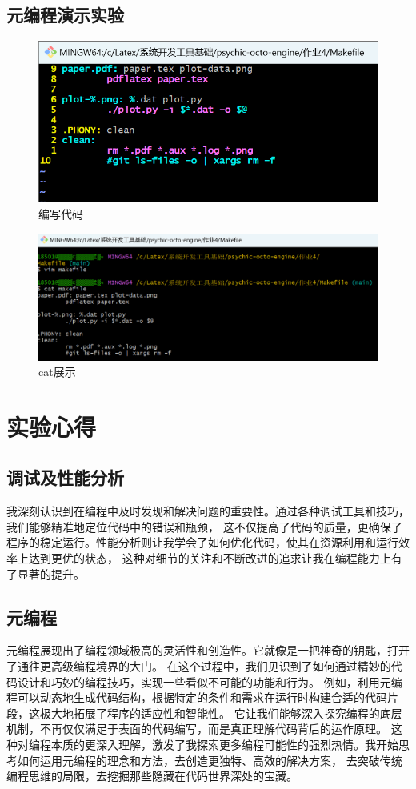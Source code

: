 \documentclass{ctexart}
\begin{document}
\subsection{元编程演示实验}
\begin{figure}[H]
    \centering
    \includegraphics[width=14cm]{09f974d450731081da5f3ccb4bd1c0a4.png}
    \caption{编写代码}
    \label{fig:12}
    \end{figure}   
    \begin{figure}[H]
        \centering
        \includegraphics[width=14cm]{59f36beaa9e3ab13bc041dc5a0a419a5.png}
        \caption{cat展示}
        \label{fig:12}
        \end{figure}   
\section{实验心得}
\subsection{调试及性能分析}
我深刻认识到在编程中及时发现和解决问题的重要性。通过各种调试工具和技巧，我们能够精准地定位代码中的错误和瓶颈，
这不仅提高了代码的质量，更确保了程序的稳定运行。性能分析则让我学会了如何优化代码，使其在资源利用和运行效率上达到更优的状态，
这种对细节的关注和不断改进的追求让我在编程能力上有了显著的提升。

\subsection{元编程}
元编程展现出了编程领域极高的灵活性和创造性。它就像是一把神奇的钥匙，打开了通往更高级编程境界的大门。
在这个过程中，我们见识到了如何通过精妙的代码设计和巧妙的编程技巧，实现一些看似不可能的功能和行为。
例如，利用元编程可以动态地生成代码结构，根据特定的条件和需求在运行时构建合适的代码片段，这极大地拓展了程序的适应性和智能性。
它让我们能够深入探究编程的底层机制，不再仅仅满足于表面的代码编写，而是真正理解代码背后的运作原理。
这种对编程本质的更深入理解，激发了我探索更多编程可能性的强烈热情。我开始思考如何运用元编程的理念和方法，去创造更独特、高效的解决方案，
去突破传统编程思维的局限，去挖掘那些隐藏在代码世界深处的宝藏。
\end{document}
